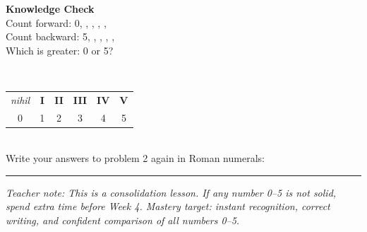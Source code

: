 \documentclass[12pt,letterpaper]{article}
\begin{document}
\goldrule

\begin{checkbox}
\noindent\textbf{\color{sd-green}Knowledge Check}\\[4pt]
\setcounter{probnum}{0}
\prob Count forward: 0, \ansblank, \ansblank, \ansblank, \ansblank, \ansblank\\[8pt]
\prob Count backward: 5, \ansblank, \ansblank, \ansblank, \ansblank, \ansblank\\[8pt]
\prob Which is greater: 0 or 5? \quad\ansblank
\end{checkbox}

\vfill
{}\\[4pt]
\begin{tabular}{cccccc}
\textit{nihil} & \textbf{I} & \textbf{II} & \textbf{III} & \textbf{IV} & \textbf{V}\\
0 & 1 & 2 & 3 & 4 & 5
\end{tabular}\\[4pt]
Write your answers to problem 2 again in Roman numerals:\\[4pt]
\hspace{1cm}\ansblank\quad\ansblank\quad\ansblank\quad\ansblank\quad\ansblank\quad\ansblank

\vspace{4pt}\hrule\vspace{3pt}
{\footnotesize\color{gray}\textit{Teacher note: This is a consolidation lesson.
  If any number 0–5 is not solid, spend extra time before Week 4.
  Mastery target: instant recognition, correct writing, and confident comparison of all numbers 0–5.}}
\end{document}
